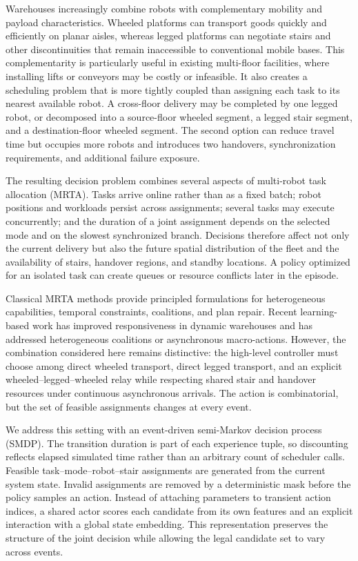 \documentclass[journal]{IEEEtran}
\begin{document}
Warehouses increasingly combine robots with complementary mobility and payload characteristics. Wheeled platforms can transport goods quickly and efficiently on planar aisles, whereas legged platforms can negotiate stairs and other discontinuities that remain inaccessible to conventional mobile bases. This complementarity is particularly useful in existing multi-floor facilities, where installing lifts or conveyors may be costly or infeasible. It also creates a scheduling problem that is more tightly coupled than assigning each task to its nearest available robot. A cross-floor delivery may be completed by one legged robot, or decomposed into a source-floor wheeled segment, a legged stair segment, and a destination-floor wheeled segment. The second option can reduce travel time but occupies more robots and introduces two handovers, synchronization requirements, and additional failure exposure.

The resulting decision problem combines several aspects of multi-robot task allocation (MRTA). Tasks arrive online rather than as a fixed batch; robot positions and workloads persist across assignments; several tasks may execute concurrently; and the duration of a joint assignment depends on the selected mode and on the slowest synchronized branch. Decisions therefore affect not only the current delivery but also the future spatial distribution of the fleet and the availability of stairs, handover regions, and standby locations. A policy optimized for an isolated task can create queues or resource conflicts later in the episode.

Classical MRTA methods provide principled formulations for heterogeneous capabilities, temporal constraints, coalitions, and plan repair. Recent learning-based work has improved responsiveness in dynamic warehouses and has addressed heterogeneous coalitions or asynchronous macro-actions. However, the combination considered here remains distinctive: the high-level controller must choose among direct wheeled transport, direct legged transport, and an explicit wheeled--legged--wheeled relay while respecting shared stair and handover resources under continuous asynchronous arrivals. The action is combinatorial, but the set of feasible assignments changes at every event.

We address this setting with an event-driven semi-Markov decision process (SMDP). The transition duration is part of each experience tuple, so discounting reflects elapsed simulated time rather than an arbitrary count of scheduler calls. Feasible task--mode--robot--stair assignments are generated from the current system state. Invalid assignments are removed by a deterministic mask before the policy samples an action. Instead of attaching parameters to transient action indices, a shared actor scores each candidate from its own features and an explicit interaction with a global state embedding. This representation preserves the structure of the joint decision while allowing the legal candidate set to vary across events.
\end{document}
